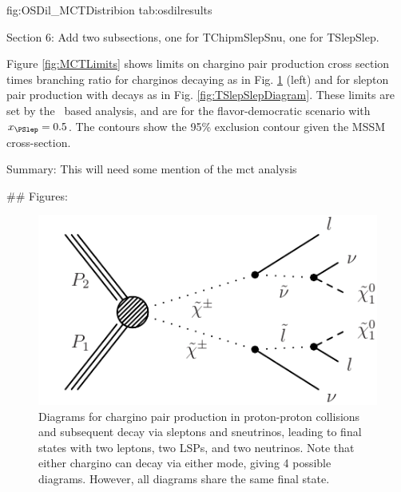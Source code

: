 fig:OSDil_MCTDistribion
tab:osdilresults


Section 6: Add two subsections, one for TChipmSlepSnu, one for TSlepSlep.

Figure \ref{fig:MCTLimits} shows limits on chargino pair production cross section times branching ratio for charginos decaying as in Fig. \ref{fig:TChipmSlepSnuDiagram} (left) and for slepton pair production with decays as in Fig. \ref{fig:TSlepSlepDiagram}. These limits are set by the \mctp\ based analysis, and are for the flavor-democratic scenario with $x_{\PSlep}=0.5$. The contours show the 95\% exclusion contour given the MSSM cross-section.

Summary: This will need some mention of the mct analysis

## Figures:

\begin{figure}
    \begin{center}
        \includegraphics[]{TChipmSlepSnuDiagram}
        \caption{Diagrams for chargino pair production in proton-proton collisions and subsequent decay via sleptons and sneutrinos, leading to final states with two leptons, two LSPs, and two neutrinos. Note that either chargino can decay via either mode, giving 4 possible diagrams. However, all diagrams share the same final state.}
        \label{fig:TChipmSlepSnuDiagram}
    \end{center}
\end{figure}

